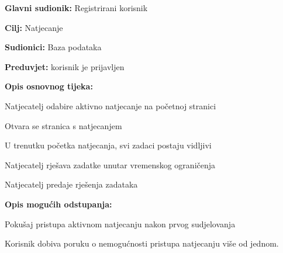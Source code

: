 					
					\noindent {}
					\begin{packed_item}
						
						\item \textbf{Glavni sudionik: } Registrirani korisnik
						\item  \textbf{Cilj:} Natjecanje
						\item  \textbf{Sudionici:} Baza podataka
						\item  \textbf{Preduvjet:}  korisnik je prijavljen
						\item  \textbf{Opis osnovnog tijeka:}
						
						\item[] \begin{packed_enum}
							\item Natjecatelj odabire aktivno natjecanje na početnoj stranici
							\item Otvara se stranica s natjecanjem
							\item U trenutku početka natjecanja, svi zadaci postaju vidljivi
							\item Natjecatelj rješava zadatke unutar vremenskog ograničenja
							\item Natjecatelj predaje rješenja zadataka
							
						\end{packed_enum}
						\item  \textbf{Opis mogućih odstupanja:}
						\item[] \begin{packed_item}
							
							\item[3.a] Pokušaj pristupa aktivnom natjecanju nakon prvog sudjelovanja
							\item[] \begin{packed_enum}
								\item Korisnik dobiva poruku o nemogućnosti pristupa natjecanju više od jednom.
							\end{packed_enum}
							
						\end{packed_item}
					\end{packed_item}
				

